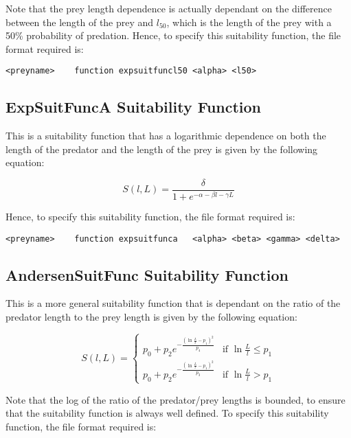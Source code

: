 \documentclass [a4paper, 10pt]{book}
\begin{document}
\bigskip
Note that the prey length dependence is actually dependant on the difference between the length of the prey and $l_{50}$, which is the length of the prey with a 50\% probability of predation.  Hence, to specify this suitability function, the file format required is:

{\small\begin{verbatim}
<preyname>    function expsuitfuncl50 <alpha> <l50>
\end{verbatim}}

\subsection{ExpSuitFuncA Suitability Function}
This is a suitability function that has a logarithmic dependence on both the length of the predator and the length of the prey is given by the following equation:

\begin{equation}\label{eq:expsuit}
S(l, L) = { \frac{\delta}{1 + e^{- \alpha - \beta l - \gamma  L}}}
\end{equation}

\bigskip
Hence, to specify this suitability function, the file format required is:

{\small\begin{verbatim}
<preyname>    function expsuitfunca   <alpha> <beta> <gamma> <delta>
\end{verbatim}}

\subsection{AndersenSuitFunc Suitability Function}
This is a more general suitability function that is dependant on the ratio of the predator length to the prey length is given by the following equation:

\begin{equation}\label{eq:andersensuit}
S(l, L) =
\begin{cases}
  p_0 + p_2e^{-\frac{(\ln\frac{L}{l} - p_1)^2}{p_4}}
  & \textrm{if $\ln\frac{L}{l} \leq p_1$}\\
  p_0 + p_2e^{-\frac{(\ln\frac{L}{l} - p_1)^2}{p_3}}
  & \textrm{if $\ln\frac{L}{l} > p_1$}
\end{cases}
\end{equation}

\bigskip
Note that the log of the ratio of the predator/prey lengths is bounded, to ensure that the suitability function is always well defined.  To specify this suitability function, the file format required is:
\end{document}
